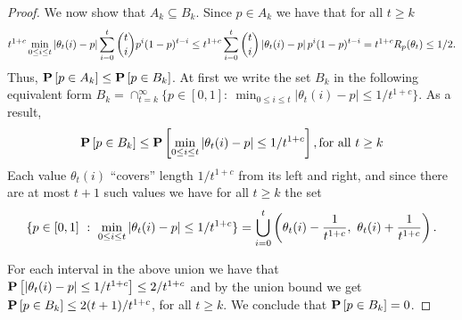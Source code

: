 \begin{proof}
  We now show that $A_k \subseteq B_k$.
  Since $p \in A_k$ we have that for all $t\geq k$
  \[
    t^{1 + c} \min_{0 \leq i \leq t} \left| \theta_t(i) - p \right|
    \sum_{i=0}^t \binom{t}{i} p^i (1-p)^{t-i}
    \leq
    t^{1 + c} \sum_{i=0}^t \binom{t}{i} \left| \theta_t(i) - p \right| p^i (1-p)^{t-i}
    = t^{1+c} R_p(\theta_t)
    \leq
    1/2.
  \]
  Thus, $\bm{\mathrm{P}}\left[p \in A_k\right] \leq \bm{\mathrm{P}}\left[p \in B_k\right]$.
  At first we write the set $B_k$ in the following equivalent form
  $
  B_k = \cap_{t=k}^{\infty}\{p \in [0,1]:~ \min_{0 \leq
    i \leq t} |\theta_t(i)-p|\leq 1/t^{1+c}
  \}$.
  As a result,
  \[
    \bm{\mathrm{P}}\left[p \in B_k\right]
    \leq \bm{\mathrm{P}}\left[\min_{0 \leq i \leq t}|\theta_t(i)-p| \leq 1/t^{1+c} \right],
    \text{for all } t \geq k
  \]
  Each value $\theta_t(i)$ \enquote{covers} length $1/t^{1+c}$ from
  its left and right, and since there are at most $t+1$ such values
  we have for all $t \geq k$ the set
  \[
    \{
    p \in [0,1]\ :\ {\min_{0 \leq i \leq t} |\theta_t(i)-p| \leq 1/t^{1+c} }
    \}
    =
    \bigcup_{i=0}^t
    \left(
    \theta_t(i) - \frac{1}{t^{1+c}},\ \theta_t(i) + \frac{1}{t^{1+c}}
    \right).
  \]

  For each interval in the above union we have that
  $\bm{\mathrm{P}}\left[|\theta_t(i)-p| \leq 1/t^{1+c}\right]\leq 2/t^{1+c}$
  and by the union bound we get
  $\bm{\mathrm{P}}\left[p \in B_k\right] \leq 2(t+1)/t^{1+c}$, for all $t \geq k$.
  We conclude that $\bm{\mathrm{P}}\left[p \in B_k\right] =0$.
\end{proof}
